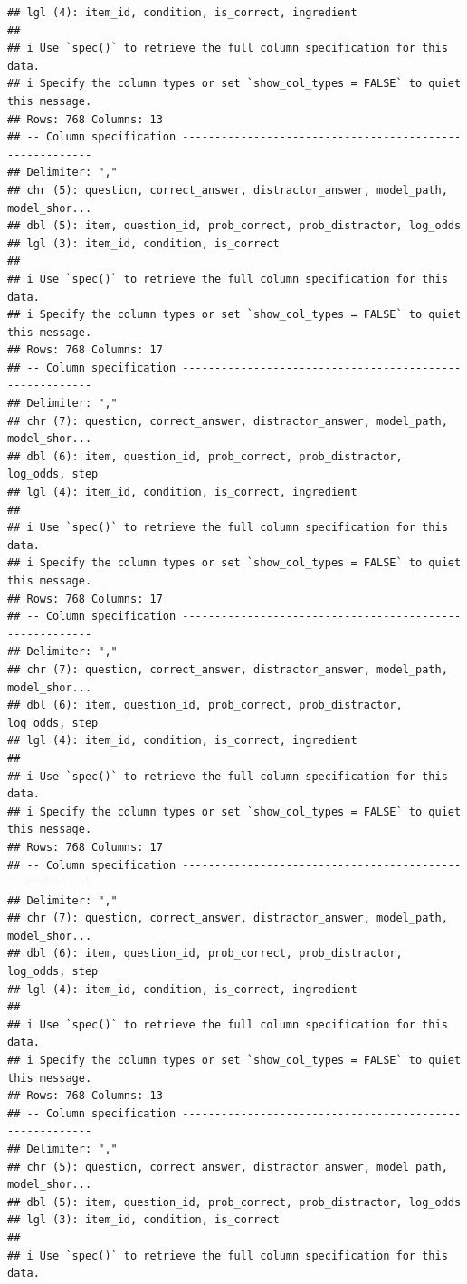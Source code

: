 \documentclass[
]{article}
\begin{document}
\begin{verbatim}
## lgl (4): item_id, condition, is_correct, ingredient
## 
## i Use `spec()` to retrieve the full column specification for this data.
## i Specify the column types or set `show_col_types = FALSE` to quiet this message.
## Rows: 768 Columns: 13
## -- Column specification --------------------------------------------------------
## Delimiter: ","
## chr (5): question, correct_answer, distractor_answer, model_path, model_shor...
## dbl (5): item, question_id, prob_correct, prob_distractor, log_odds
## lgl (3): item_id, condition, is_correct
## 
## i Use `spec()` to retrieve the full column specification for this data.
## i Specify the column types or set `show_col_types = FALSE` to quiet this message.
## Rows: 768 Columns: 17
## -- Column specification --------------------------------------------------------
## Delimiter: ","
## chr (7): question, correct_answer, distractor_answer, model_path, model_shor...
## dbl (6): item, question_id, prob_correct, prob_distractor, log_odds, step
## lgl (4): item_id, condition, is_correct, ingredient
## 
## i Use `spec()` to retrieve the full column specification for this data.
## i Specify the column types or set `show_col_types = FALSE` to quiet this message.
## Rows: 768 Columns: 17
## -- Column specification --------------------------------------------------------
## Delimiter: ","
## chr (7): question, correct_answer, distractor_answer, model_path, model_shor...
## dbl (6): item, question_id, prob_correct, prob_distractor, log_odds, step
## lgl (4): item_id, condition, is_correct, ingredient
## 
## i Use `spec()` to retrieve the full column specification for this data.
## i Specify the column types or set `show_col_types = FALSE` to quiet this message.
## Rows: 768 Columns: 17
## -- Column specification --------------------------------------------------------
## Delimiter: ","
## chr (7): question, correct_answer, distractor_answer, model_path, model_shor...
## dbl (6): item, question_id, prob_correct, prob_distractor, log_odds, step
## lgl (4): item_id, condition, is_correct, ingredient
## 
## i Use `spec()` to retrieve the full column specification for this data.
## i Specify the column types or set `show_col_types = FALSE` to quiet this message.
## Rows: 768 Columns: 13
## -- Column specification --------------------------------------------------------
## Delimiter: ","
## chr (5): question, correct_answer, distractor_answer, model_path, model_shor...
## dbl (5): item, question_id, prob_correct, prob_distractor, log_odds
## lgl (3): item_id, condition, is_correct
## 
## i Use `spec()` to retrieve the full column specification for this data.

\end{verbatim}
\end{document}
